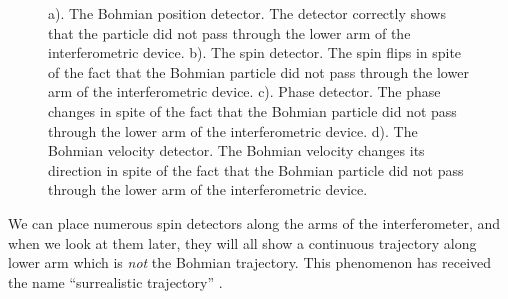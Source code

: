 \documentclass[12pt,preprint,tightenlines]{elsarticle}
\begin{document}
\begin{figure}[H]
{     a). The Bohmian position detector.  The detector correctly shows that the particle did not pass through the lower arm of the interferometric device.
      b). The spin detector.  The spin flips in spite of the fact that the Bohmian particle did not pass through the lower arm of the interferometric device.
       c). Phase  detector.  The phase changes in spite of the fact that the Bohmian particle did not pass through the lower arm of the interferometric device.
        d). The Bohmian velocity  detector.  The Bohmian velocity changes its direction in spite of the fact that the Bohmian particle did not pass through the lower arm of the interferometric device.
     }
\end{figure}


We can place numerous spin detectors along the arms of the interferometer, and
when we look at them later, they will all show a continuous trajectory
along lower arm which is \textit{not} the Bohmian trajectory. This
phenomenon has received the name ``surrealistic trajectory'' \cite{englert1992surrealistic}.
\end{document}
